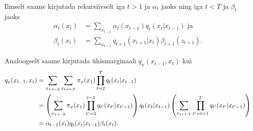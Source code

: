


Ilmselt saame kirjutada rekursiivselt iga $t > 1$ ja $\alpha_t$ jaoks ning iga $t < T$ ja $\beta_t$ jaoks
\begin{align*}
    \alpha_t(x_{t}) &= \sum_{x_{t-1}} \alpha_t(x_{t-1}) q_t(x_{t} | x_{t-1}) \text{ ja} \\
    \beta_t(x_t) &= \sum_{x_{t+1}} q_{t+1}(x_{t+1} | x_{t})\beta_{t+1}(z_{t+1}).
\end{align*}

Analoogselt saame kirjutada ühismarginaali $q_x(x_{t-1},x_t)$ kui
\begin{align}
    \notag
    q_x(x_{t-1},x_t) &= \sum_{x_{1:t-2}} \sum_{x_{t+1:T}} {\pi_x(x_1) \prod_{t=2}^T q_t(x_t|x_{t-1})}\\
    \notag
    &= \left( \sum_{x_{1:t-2}} {\pi_x(x_1) \prod_{t'=2}^{t-1} q_{t'}(x_{t'}|x_{t'-1})} \right) q_{t}(x_t|x_{t-1}) \left( \sum_{x_{t+1:T}} \prod_{t'=t+1}^T q_{t'}(x_{t'}|x_{t'-1}) \right)\\
    \label{eq:fb2}
    &= \alpha_{t-1}(x_t) q_{t}(x_t|x_{t-1}) \beta_t(x_t).
\end{align}




